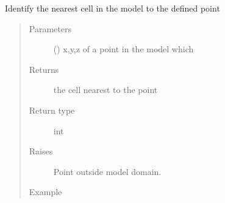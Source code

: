 \documentclass[letterpaper,10pt,english]{sphinxmanual}
\begin{document}
\begin{fulllineitems}
\begin{fulllineitems}
\label{\detokenize{openfdem:openfdem.openfdem.Model.find_cell}}
Identify the nearest cell in the model to the defined point
\begin{quote}\begin{description}
\item[{Parameters}] \leavevmode
{} (\sphinxstyleliteralemphasis{\sphinxupquote{{[}}}\sphinxstyleliteralemphasis{\sphinxupquote{, }}\sphinxstyleliteralemphasis{\sphinxupquote{, }}\sphinxstyleliteralemphasis{\sphinxupquote{{]}}}) \textendash{} x,y,z of a point in the model which

\item[{Returns}] \leavevmode
the cell nearest to the point

\item[{Return type}] \leavevmode
int

\item[{Raises}] \leavevmode
{} \textendash{} Point outside model domain.

\item[{Example}] \leavevmode
\begin{sphinxVerbatim}[commandchars=\\\{\}]
   
  
\PYG{p}{[}  \PYG{p}{]}
\PYG{p}{[}  \PYG{p}{]}
\end{sphinxVerbatim}


\end{description}
\end{quote}
\end{fulllineitems}
\end{fulllineitems}
\end{document}
